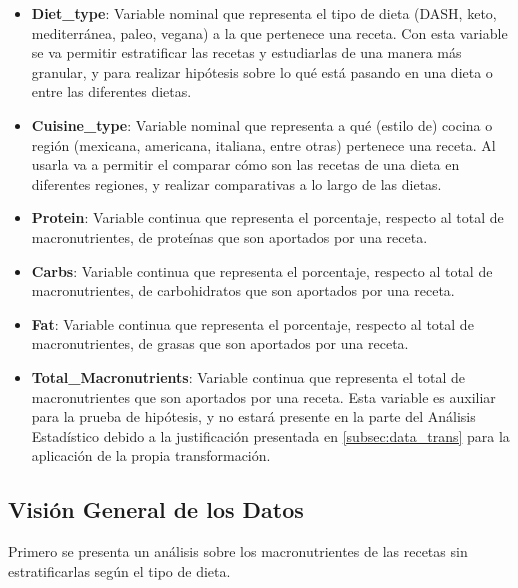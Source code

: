 \documentclass[12pt,a4paper]{article}
\begin{document}
        \begin{itemize}[label=\textbullet]

            \item \textbf{Diet\_type}: Variable nominal que representa el tipo de 
            dieta (DASH, keto, mediterránea, paleo, vegana) a la que 
            pertenece una receta. Con esta variable se va permitir estratificar 
            las recetas y estudiarlas de una manera más granular, y para realizar 
            hipótesis sobre lo qué está pasando en una dieta o entre las diferentes dietas.

            \item \textbf{Cuisine\_type}: Variable nominal que representa a qué (estilo 
            de) cocina o región (mexicana, americana, italiana, entre otras) pertenece una 
            receta. Al usarla va a permitir el comparar cómo son las recetas 
            de una dieta en diferentes regiones, y realizar comparativas a lo 
            largo de las dietas.

            \item \textbf{Protein}: Variable continua que representa el 
            porcentaje, respecto al total de macronutrientes, de proteínas que son 
            aportados por una receta.
            \item \textbf{Carbs}: Variable continua que representa el 
            porcentaje, respecto al total de macronutrientes, de carbohidratos que 
            son aportados por una receta.

            \item \textbf{Fat}: Variable continua que representa el 
            porcentaje, respecto al total de macronutrientes, de grasas que son 
            aportados por una receta.

            \item \textbf{Total\_Macronutrients}: Variable continua que representa 
            el total de macronutrientes que son aportados por una receta. Esta variable 
            es auxiliar para la prueba de hipótesis, y no estará presente en la parte 
            del Análisis Estadístico debido a la justificación presentada en 
            \ref{subsec:data_trans}  para la aplicación de la 
            propia transformación.

        \end{itemize}

    \subsection{Visión General de los Datos}
        Primero se presenta un análisis sobre los macronutrientes de 
        las recetas sin estratificarlas según el tipo de dieta.
\end{document}
